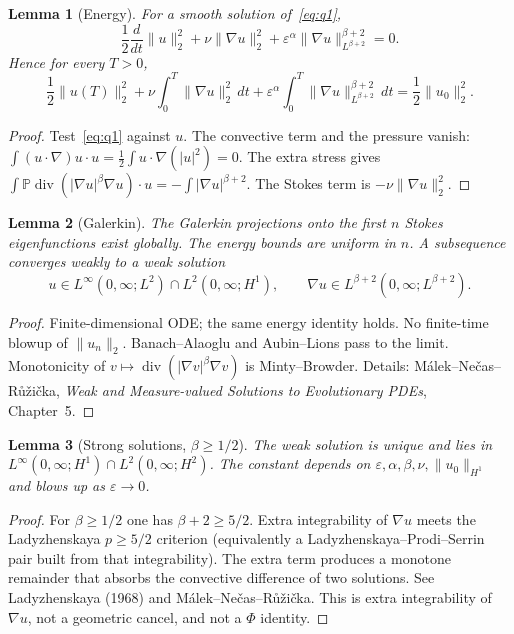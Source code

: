 \documentclass[11pt]{article}
\newtheorem{lemma}{Lemma}
\begin{document}
\begin{lemma}[Energy]
For a smooth solution of~\eqref{eq:q1},
\[
\frac12\frac{d}{dt}\|u\|_2^2
+\nu\|\nabla u\|_2^2
+\varepsilon^\alpha\|\nabla u\|_{L^{\beta+2}}^{\beta+2}
=0.
\]
Hence for every \(T>0\),
\[
\frac12\|u(T)\|_2^2
+\nu\int_0^T\|\nabla u\|_2^2\,dt
+\varepsilon^\alpha\int_0^T\|\nabla u\|_{L^{\beta+2}}^{\beta+2}\,dt
=\frac12\|u_0\|_2^2.
\]
\end{lemma}

\begin{proof}
Test~\eqref{eq:q1} against \(u\). The convective term and
the pressure vanish:
\(\int(u\cdot\nabla)u\cdot u=\frac12\int u\cdot\nabla(|u|^2)=0\).
The extra stress gives
\(\int\mathbb{P}\operatorname{div}(|\nabla u|^\beta\nabla u)\cdot u
=-\int|\nabla u|^{\beta+2}\).
The Stokes term is \(-\nu\|\nabla u\|_2^2\).
\end{proof}

\begin{lemma}[Galerkin]
The Galerkin projections onto the first \(n\) Stokes
eigenfunctions exist globally. The energy bounds are
uniform in \(n\). A subsequence converges weakly to a
weak solution
\[
u\in L^\infty(0,\infty;L^2)\cap L^2(0,\infty;H^1),
\qquad
\nabla u\in L^{\beta+2}(0,\infty;L^{\beta+2}).
\]
\end{lemma}

\begin{proof}
Finite-dimensional ODE; the same energy identity holds.
No finite-time blowup of \(\|u_n\|_2\). Banach--Alaoglu
and Aubin--Lions pass to the limit. Monotonicity of
\(v\mapsto\operatorname{div}(|\nabla v|^\beta\nabla v)\)
is Minty--Browder. Details:
M\'alek--Ne\v{c}as--R\r{u}\v{z}i\v{c}ka,
\textit{Weak and Measure-valued Solutions to Evolutionary PDEs},
Chapter~5.
\end{proof}

\begin{lemma}[Strong solutions, \(\beta\ge 1/2\)]
The weak solution is unique and lies in
\(L^\infty(0,\infty;H^1)\cap L^2(0,\infty;H^2)\).
The constant depends on
\(\varepsilon,\alpha,\beta,\nu,\|u_0\|_{H^1}\)
and blows up as \(\varepsilon\to 0\).
\end{lemma}

\begin{proof}
For \(\beta\ge 1/2\) one has \(\beta+2\ge 5/2\). Extra
integrability of \(\nabla u\) meets the Ladyzhenskaya
\(p\ge 5/2\) criterion (equivalently a
Ladyzhenskaya--Prodi--Serrin pair built from that
integrability). The extra term produces a monotone
remainder that absorbs the convective difference of two
solutions. See Ladyzhenskaya (1968) and
M\'alek--Ne\v{c}as--R\r{u}\v{z}i\v{c}ka.
This is extra integrability of \(\nabla u\), not a
geometric cancel, and not a \(\Phi\) identity.
\end{proof}
\end{document}
